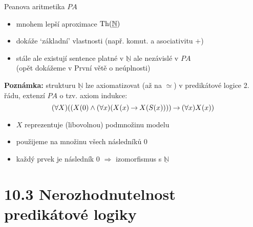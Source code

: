\documentclass{beamer}
\begin{document}
\begin{frame}{Peanova aritmetika $PA$}    


    \begin{itemize}
        \item mnohem lepší aproximace $\operatorname{Th}(\underline{\mathbb N})$
        \item dokáže `základní' vlastnosti (např. komut. a asociativitu $+$) \item stále ale existují sentence platné v $\underline{\mathbb N}$ ale nezávislé v $PA$\\(opět dokážeme v První větě o neúplnosti)
    \end{itemize}

    \bigskip

    \textbf{Poznámka:} strukturu $\underline{\mathbb N}$ lze axiomatizovat (až na $\simeq$) v predikátové logice \alert{2. řádu}, extenzí $PA$ o tzv. \alert{axiom indukce}:
    $$
    (\forall X)((X(0) \land (\forall x)(X(x) \mathbin{\rightarrow} X(S(x)))) \mathbin{\rightarrow} (\forall x)X(x))
    $$

    \begin{itemize}
        \item $X$ reprezentuje (libovolnou) podmnožinu modelu
        \item použijeme na množinu všech následníků 0
        \item každý prvek je následník 0 $\Rightarrow$ izomorfismus s $\underline{\mathbb N}$
    \end{itemize}

\end{frame}


\section{10.3 Nerozhodnutelnost predikátové logiky}
\end{document}
